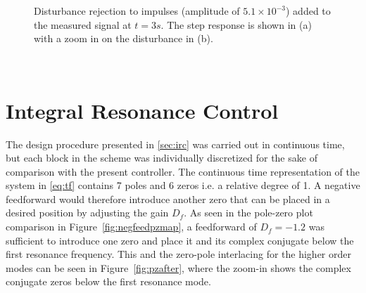 \begin{figure}[h!]
  \centering %
  \qquad
  \caption{\label{fig:distmeasrejection} Disturbance rejection to impulses (amplitude of $5.1 \times 10^{-3}$) added to the measured signal at $t=3s$. The step response is shown in (a)  with a zoom in on the disturbance in (b).}
\end{figure}

\newpage~\newpage~
\FloatBarrier
\section{Integral Resonance Control}
The \abbrIRC design procedure presented in \ref{sec:irc} was carried out in continuous time, but each block in the scheme was individually discretized for the sake of comparison with the present controller. The continuous time representation of the system in \eqref{eq:tf} contains 7 poles and 6 zeros i.e. a relative degree of 1. A negative feedforward would therefore introduce another zero that can be placed in a desired position by adjusting the gain $D_f$. As seen in the pole-zero plot comparison in Figure~\ref{fig:negfeedpzmap}, a feedforward of $D_f=-1.2$ was sufficient to introduce one zero and place it and its complex conjugate below the first resonance frequency. This and the zero-pole interlacing for the higher order modes can be seen in Figure~\ref{fig:pzafter}, where the zoom-in shows the complex conjugate zeros below the first resonance mode.

